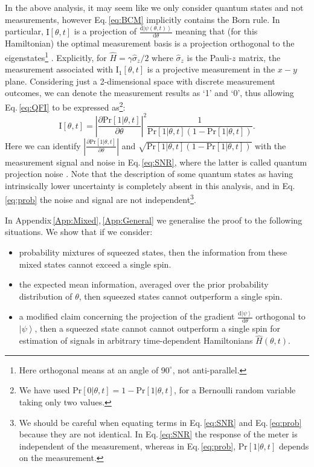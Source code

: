 \documentclass[reqno]{amsart}
\def\be{\begin{equation}}
\def\ee{\end{equation}}
\newcommand{\ket}[1]{\left| #1 \right>}
\newcommand{\hham}{\hat{H}}
\def\func#1#2{\mathrm{#1}\left[#2\right]}
\def\funcwrt#1#2#3{\mathrm{#1}_{\mathrm{#3}}\left[#2\right]}
\begin{document}
In the above analysis, it may seem like we only consider quantum states and not measurements, however Eq.\,\eqref{eq:BCM} implicitly contains the Born rule. In particular, $\func{I}{\theta,t}$ is a projection of $\frac{\mathrm{d}\ket{\psi(\theta,t)}}{\mathrm{d} \theta}$ meaning that (for this Hamiltonian) the optimal measurement basis is a projection orthogonal to the eigenstates\footnote{Here orthogonal means at an angle of $90^{\circ}$, not anti-parallel.} \cite{Braunstein1996, Childs2000, Giovannetti2004, Pang2017}. Explicitly, for $\hham = \gamma \hat{\sigma}_z/2$ where $\hat{\sigma}_z$ is the Pauli-$z$ matrix, the measurement associated with $\funcwrt{I}{\theta,t}{1}$ is a projective measurement in the $x-y$ plane. Considering just a 2-dimensional space with discrete measurement outcomes, we can denote the measurement results as `1' and `0', thus allowing Eq.\,\eqref{eq:QFI} to be expressed as\footnote{We have used $\func{Pr}{0|\theta,t} = 1 - \func{Pr}{1|\theta,t}$, for a Bernoulli random variable taking only two values.}:
\be
\func{I}{\theta,t} = \left|\frac{\partial \func{Pr}{1|\theta,t}}{\partial \theta}\right|^{2} \frac{1}{\func{Pr}{1|\theta,t}\left(1-\func{Pr}{1|\theta,t}\right)}.
\label{eq:prob}
\ee
Here we can identify $\left|\frac{\partial \func{Pr}{1|\theta,t}}{\partial \theta}\right|$ and $\sqrt{\func{Pr}{1|\theta,t}\left(1-\func{Pr}{1|\theta,t}\right)}$ with the measurement signal and noise in Eq.\,\eqref{eq:SNR}, where the latter is called quantum projection noise \cite{Itano1993}. Note that the description of some quantum states as having intrinsically lower uncertainty is completely absent in this analysis, and in Eq.\,\eqref{eq:prob} the noise and signal are not independent\footnote{We should be careful when equating terms in Eq.\,\eqref{eq:SNR} and Eq.\,\eqref{eq:prob} because they are not identical. In Eq.\,\eqref{eq:SNR} the response of the meter is independent of the measurement, whereas in Eq.\,\eqref{eq:prob}, $\func{Pr}{1|\theta,t}$ depends on the measurement.}.

In Appendix\,\ref{App:Mixed},\,\ref{App:General} we generalise the proof to the following situations. We show that if we consider:
\begin{itemize}
\item probability mixtures of squeezed states, then the information from these mixed states cannot exceed a single spin.
\item the expected mean information, averaged over the prior probability distribution of $\theta$, then squeezed states cannot outperform a single spin.
\item a modified claim concerning the projection of the gradient $\frac{\mathrm{d} \ket{\psi}}{\mathrm{d}\theta}$ orthogonal to $\ket{\psi}$, then a squeezed state cannot cannot outperform a single spin for estimation of signals in arbitrary time-dependent Hamiltonians $\hham(\theta, t)$.
\end{itemize}
\end{document}
